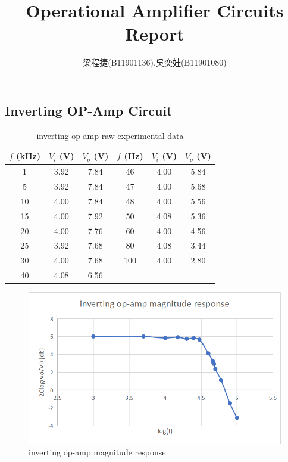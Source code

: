 \documentclass{article}
\title{Operational Amplifier Circuits Report}
\author{梁程捷(B11901136),吳奕娃(B11901080)}
\date{}
\begin{document}
\begin{CJK*}{UTF8}{bkai}
\maketitle

\section*{Inverting OP-Amp Circuit}
\begin{minipage}{0.5\textwidth}
\begin{table}[H]
\begin{tabular}{|c|c|c||c|c|c|}
    \hline
    $f$ (\unit{\kilo\hertz}) &  $V_i$ (V)& $V_o$ (V) & $f$ (\unit{\hertz}) &  $V_i$ (V)& $V_o$ (V)\\
    \hline\hline
    1	& 3.92 & 7.84 & 46  & 4.00 & 5.84   \\
    5   & 3.92 & 7.84 & 47  & 4.00 & 5.68  \\
    10	& 4.00 & 7.84 & 48  & 4.00 & 5.56   \\
    15	& 4.00 & 7.92 & 50  & 4.08 & 5.36   \\
    20	& 4.00 & 7.76 & 60  & 4.00 & 4.56   \\
    25	& 3.92 & 7.68 & 80  & 4.08 & 3.44   \\
    30	& 4.00 & 7.68 & 100 & 4.00 & 2.80   \\
    40	& 4.08 & 6.56 &     &      &        \\

 \hline
\end{tabular}
\caption{inverting op-amp raw experimental data}
\end{table}
\end{minipage}\hspace{20mm}
\begin{minipage}{0.5\textwidth}
    \begin{figure}[H]    
        \includegraphics[scale=0.30]{inv_op_amp.png}
        \caption{inverting op-amp magnitude response}
    \end{figure}
\end{minipage}



\end{CJK*}
\end{document}
